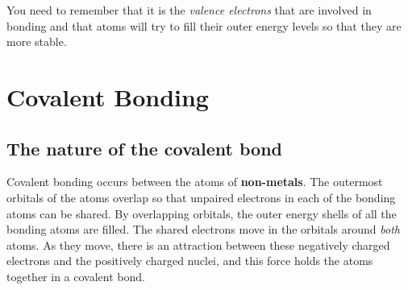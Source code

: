 You need to remember that it is the \textit{valence electrons} that are involved in bonding and that atoms will try to fill their outer energy levels so that they are more stable.






\section{Covalent Bonding}
\label{subsec:bonding:covalent}

\subsection{The nature of the covalent bond}

Covalent bonding occurs between the atoms of \textbf{non-metals}. The outermost orbitals of the atoms overlap so that unpaired electrons in each of the bonding atoms can be shared. By overlapping orbitals, the outer energy shells of all the bonding atoms are filled. The shared electrons move in the orbitals around \textit{both} atoms. As they move, there is an attraction between these negatively charged electrons and the positively charged nuclei, and this force holds the atoms together in a covalent bond.

